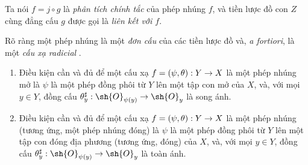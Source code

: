 \documentclass[oneside]{amsart}
\makeatletter
\newcommand{\ega@arrow}[2]{\mathchoice{#1}{#2}{#2}{#2}}
\renewcommand{\to}{\ega@arrow{\longrightarrow}{\rightarrow}}
\let\EGAOriginalLabel\label
\renewcommand{\label}[1]{\phantomsection\EGAOriginalLabel{#1}}
\makeatother
\begin{document}
Ta nói $f=j\circ g$ là \emph{phân tích chính tắc} của phép nhúng $f$, và tiền lược đồ con $Z$ cùng đẳng cấu $g$ được gọi là \emph{liên kết với $f$}.

Rõ ràng một phép nhúng là một \emph{đơn cấu} của các tiền lược đồ  và, \emph{a fortiori}, là một \emph{cấu xạ radicial} .

\begin{proposition}[4.2.2]
\label{I.4.2.2}
\medskip\noindent
\begin{enumerate}
  \item[{\rm(a)}] Điều kiện cần và đủ để một cấu xạ $f=(\psi,\theta):Y\to X$ là một phép nhúng mở là $\psi$ là một phép đồng phôi từ $Y$ lên một tập con mở của $X$, và, với mọi $y\in Y$, đồng cấu $\theta_y^\sharp:\sh{O}_{\psi(y)}\to\sh{O}_y$ là song ánh.
  \item[{\rm(b)}] Điều kiện cần và đủ để một cấu xạ $f=(\psi,\theta):Y\to X$ là một phép nhúng (tương ứng, một phép nhúng đóng) là $\psi$ là một phép đồng phôi từ $Y$ lên một tập con đóng địa phương (tương ứng, đóng) của $X$, và, với mọi $y\in Y$, đồng cấu $\theta_y^\sharp:\sh{O}_{\psi(y)}\to\sh{O}_y$ là toàn ánh.
\end{enumerate}
\end{proposition}
\end{document}
